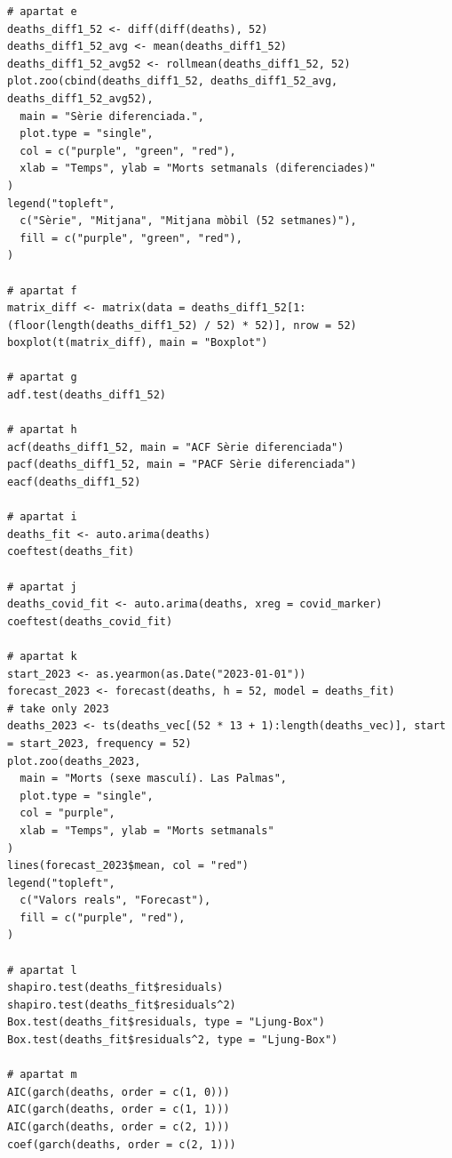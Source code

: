 \documentclass[a4paper, 11pt]{article}
\begin{document}
\begin{verbatim}
# apartat e
deaths_diff1_52 <- diff(diff(deaths), 52)
deaths_diff1_52_avg <- mean(deaths_diff1_52)
deaths_diff1_52_avg52 <- rollmean(deaths_diff1_52, 52)
plot.zoo(cbind(deaths_diff1_52, deaths_diff1_52_avg, deaths_diff1_52_avg52),
  main = "Sèrie diferenciada.",
  plot.type = "single",
  col = c("purple", "green", "red"),
  xlab = "Temps", ylab = "Morts setmanals (diferenciades)"
)
legend("topleft",
  c("Sèrie", "Mitjana", "Mitjana mòbil (52 setmanes)"),
  fill = c("purple", "green", "red"),
)

# apartat f
matrix_diff <- matrix(data = deaths_diff1_52[1:(floor(length(deaths_diff1_52) / 52) * 52)], nrow = 52)
boxplot(t(matrix_diff), main = "Boxplot")

# apartat g
adf.test(deaths_diff1_52)

# apartat h
acf(deaths_diff1_52, main = "ACF Sèrie diferenciada")
pacf(deaths_diff1_52, main = "PACF Sèrie diferenciada")
eacf(deaths_diff1_52)

# apartat i
deaths_fit <- auto.arima(deaths)
coeftest(deaths_fit)

# apartat j
deaths_covid_fit <- auto.arima(deaths, xreg = covid_marker)
coeftest(deaths_covid_fit)

# apartat k
start_2023 <- as.yearmon(as.Date("2023-01-01"))
forecast_2023 <- forecast(deaths, h = 52, model = deaths_fit)
# take only 2023
deaths_2023 <- ts(deaths_vec[(52 * 13 + 1):length(deaths_vec)], start = start_2023, frequency = 52)
plot.zoo(deaths_2023,
  main = "Morts (sexe masculí). Las Palmas",
  plot.type = "single",
  col = "purple",
  xlab = "Temps", ylab = "Morts setmanals"
)
lines(forecast_2023$mean, col = "red")
legend("topleft",
  c("Valors reals", "Forecast"),
  fill = c("purple", "red"),
)

# apartat l
shapiro.test(deaths_fit$residuals)
shapiro.test(deaths_fit$residuals^2)
Box.test(deaths_fit$residuals, type = "Ljung-Box")
Box.test(deaths_fit$residuals^2, type = "Ljung-Box")

# apartat m
AIC(garch(deaths, order = c(1, 0)))
AIC(garch(deaths, order = c(1, 1)))
AIC(garch(deaths, order = c(2, 1)))
coef(garch(deaths, order = c(2, 1)))
\end{verbatim}
\end{document}

